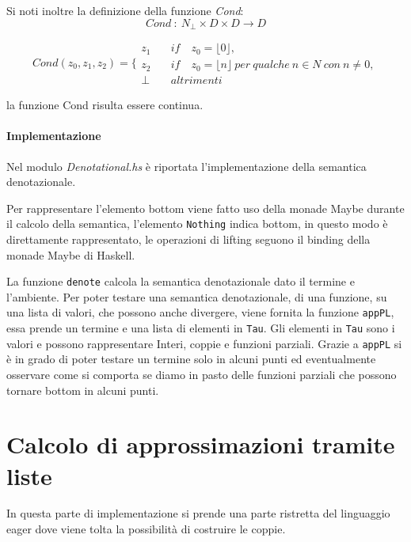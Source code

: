 \documentclass{article}
\begin{document}
Si noti inoltre la definizione della funzione \emph{Cond}:
$$
Cond\ :\ N_{\perp} \times D \times D \rightarrow D
$$

\begin{equation*}
\left.
Cond (z_{0},z_{1},z_{2}) =
\right.\Bigg\{
\begin{aligned}
z_{1} \quad & if \quad z_{0} = \lfloor 0 \rfloor,
\\
z_{2} \quad & if \quad z_{0} = \lfloor n \rfloor \ per \ qualche\ n\in N \ con\ n \neq 0,
\\
\perp \quad & altrimenti 
\end{aligned}
\end{equation*}

la funzione Cond risulta essere continua.

\paragraph{Implementazione}
Nel modulo \emph{Denotational.hs} è riportata l'implementazione della semantica denotazionale.

Per rappresentare l'elemento bottom viene fatto uso della monade Maybe durante il calcolo della semantica, l'elemento \texttt{Nothing} indica bottom, in questo modo è direttamente rappresentato, le operazioni di lifting seguono il binding della monade Maybe di Haskell.

La funzione \texttt{denote} calcola la semantica denotazionale dato il termine e l'ambiente. Per poter testare una semantica denotazionale, di una funzione, su una lista di valori, che possono anche divergere, viene fornita la funzione \texttt{appPL}, essa prende un termine e una lista di elementi in \texttt{Tau}. Gli elementi in \texttt{Tau} sono i valori e possono rappresentare Interi, coppie e funzioni parziali.
Grazie a \texttt{appPL} si è in grado di poter testare un termine solo in alcuni punti ed eventualmente osservare come si comporta se diamo in pasto delle funzioni parziali che possono tornare bottom in alcuni punti.


\section{Calcolo di approssimazioni tramite liste}
\label{sec:approximations}
In questa parte di implementazione si prende una parte ristretta del linguaggio eager dove viene tolta la possibilità di costruire le coppie.
\end{document}
